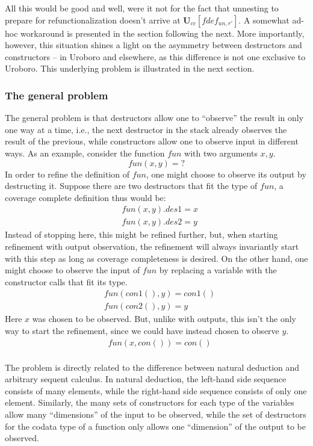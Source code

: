 All this would be good and well, were it not for the fact that unnesting to prepare for refunctionalization doesn't arrive at $\mathbf{U}_{cc}[fdef_{un,r'}]$. A somewhat ad-hoc workaround is presented in the section following the next. More importantly, however, this situation shines a light on the asymmetry between destructors and constructors -- in Uroboro and elsewhere, as this difference is not one exclusive to Uroboro. This underlying problem is illustrated in the next section.

\subsubsection{The general problem}

The general problem is that destructors allow one to ``observe'' the result in only one way at a time, i.e., the next destructor in the stack already observes the result of the previous, while constructors allow one to observe input in different ways. As an example, consider the function $fun$ with two arguments $x, y$.
\[
fun(x, y) = ?
\]
In order to refine the definition of $fun$, one might choose to observe its output by destructing it. Suppose there are two destructors that fit the type of $fun$, a coverage complete definition thus would be:
\begin{align*}
& fun(x, y).des1 = x \\
& fun(x, y).des2 = y
\end{align*}
Instead of stopping here, this might be refined further, but, when starting refinement with output observation, the refinement will always invariantly start with this step as long as coverage completeness is desired. On the other hand, one might choose to observe the input of $fun$ by replacing a variable with the constructor calls that fit its type.
\begin{align*}
& fun(con1(), y) = con1() \\
& fun(con2(), y) = y
\end{align*}
Here $x$ was chosen to be observed. But, unlike with outputs, this isn't the only way to start the refinement, since we could have instead chosen to observe $y$.
\begin{align*}
& fun(x, con()) = con() \\
\end{align*}

The problem is directly related to the difference between natural deduction and arbitrary sequent calculus. In natural deduction, the left-hand side sequence consists of many elements, while the right-hand side sequence consists of only one element. Similarly, the many sets of constructors for each type of the variables allow many ``dimensions'' of the input to be observed, while the set of destructors for the codata type of a function only allows one ``dimension'' of the output to be observed.

